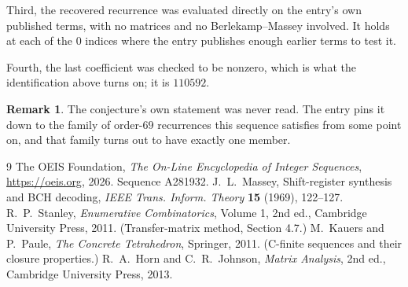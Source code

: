\documentclass[11pt,a4paper]{article}
\theoremstyle{plain}
\theoremstyle{definition}
\newtheorem{remark}[theorem]{Remark}
\begin{document}
Third, the recovered recurrence was evaluated directly on the entry's own published terms, with
no matrices and no Berlekamp--Massey involved. It holds at each of the $0$ indices where
the entry publishes enough earlier terms to test it.

Fourth, the last coefficient was checked to be nonzero, which is what the identification above
turns on; it is $110592$.

\begin{remark}
The conjecture's own statement was never read. The entry pins it down to the family of
order-$69$ recurrences this sequence satisfies from some point on, and that family turns
out to have exactly one member.
\end{remark}

\begin{thebibliography}{9}
 The OEIS Foundation, \emph{The On-Line Encyclopedia of Integer
Sequences}, \url{https://oeis.org}, 2026. Sequence A281932.
 J.~L.~Massey, Shift-register synthesis and BCH decoding, \emph{IEEE
Trans. Inform. Theory} \textbf{15} (1969), 122--127.
 R.~P.~Stanley, \emph{Enumerative Combinatorics}, Volume 1, 2nd ed.,
Cambridge University Press, 2011. (Transfer-matrix method, Section 4.7.)
 M.~Kauers and P.~Paule, \emph{The Concrete Tetrahedron}, Springer, 2011.
(C-finite sequences and their closure properties.)
 R.~A.~Horn and C.~R.~Johnson, \emph{Matrix Analysis}, 2nd ed., Cambridge
University Press, 2013.
\end{thebibliography}
\end{document}

